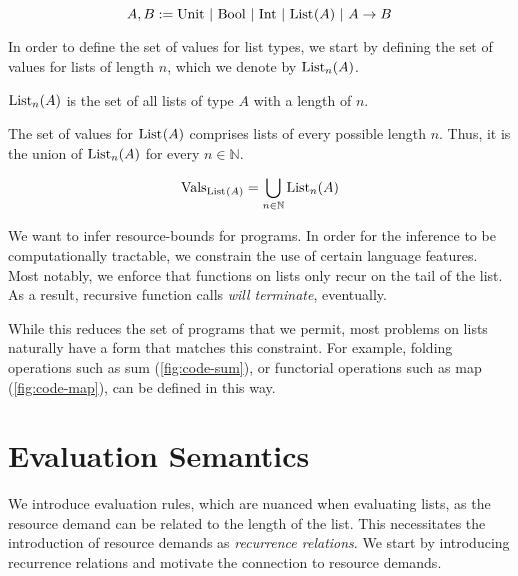 \begin{definition}\label{def:type-system-6}
   \[
      A, B := \text{Unit}~|~\text{\text{Bool}}~|~\text{\text{Int}}~|~\text{List}^{}(A)~|~A \to B ^{}_{}
   \]
\end{definition}

In order to define the set of values for list types, we start by defining the set of values for lists of length \(n\), which we denote by \(\text{List}_{n}(A)\). 

\begin{definition}\label{def:lists-of-length-n}
   \(\text{List}_{n}(A)\) is the set of all lists of type \(A\) with a length of \(n\).
\end{definition}

The set of values for \(\text{List}^{}(A)\) comprises lists of every possible length \(n\). Thus, it is the union of \(\text{List}_{n}(A)\) for every \(n \in \mathbb{N}\). 

\begin{definition}
   \begin{displaymath}
      \text{Vals}_{\text{List}^{}(A)} = \bigcup_{n \in \mathbb{N}} \text{List}_{n}(A)
   \end{displaymath}
\end{definition}


We want to infer resource-bounds for programs. In order for the inference to be computationally tractable, we constrain the use of certain language features. Most notably, we enforce that functions on lists only recur on the tail of the list. As a result, recursive function calls \emph{will terminate}, eventually.

While this reduces the set of programs that we permit, most problems on lists naturally have a form that matches this constraint. For example, folding operations such as sum (\cref{fig:code-sum}), or functorial operations such as map (\cref{fig:code-map}), can be defined in this way. 


\section{Evaluation Semantics}

We introduce evaluation rules, which are nuanced when evaluating lists, as the resource demand can be related to the length of the list. This necessitates the introduction of resource demands as \emph{recurrence relations}. We start by introducing recurrence relations and motivate the connection to resource demands. 

